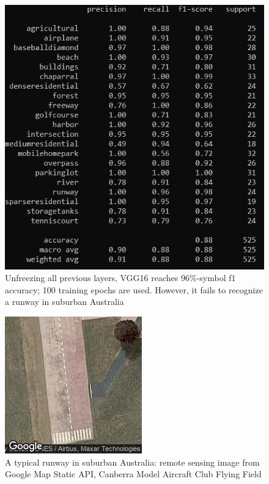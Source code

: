\documentclass[10pt,twocolumn,letterpaper]{article}
\begin{document}
\begin{figure}[t]
\begin{center}
   \includegraphics[width=1.0\linewidth]{vgg16.jpg}
\end{center}
   \caption{Unfreezing all previous layers, VGG16 reaches 96\%-symbol f1 accuracy; 100 training epochs are used. However, it fails to recognize a runway in suburban Australia}
\label{fig:long}
\label{fig:onecol}
\end{figure}
\begin{figure}[t]
\begin{center}
   \includegraphics[width=1.0\linewidth]{sample_runway.jpg}
\end{center}
   \caption{A typical runway in suburban Australia: remote sensing image from Google Map Static API, Canberra Model Aircraft Club Flying Field}
\label{fig:long}
\label{fig:onecol}
\end{figure}
\end{document}
